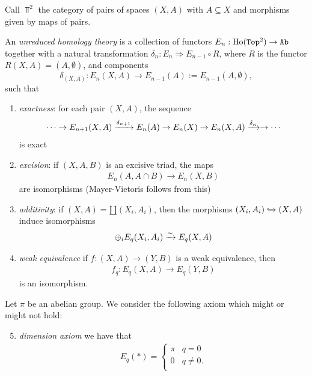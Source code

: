 \documentclass{article}[11pt]
\begin{document}
Call $\Top^2$ the category of pairs of spaces $(X,A)$ with $A\subseteq X$ and morphisms given by maps of pairs.

\begin{definition}\label{defn:unreduced-homology-thy} An \textit{unreduced homology theory} is a collection of functors $E_n : \text{Ho}(\texttt{Top}^2) \to \texttt{Ab}$ together with a natural transformation $\delta_n: E_n \Rightarrow E_{n-1}\circ R$, where $R$ is the functor $R(X,A) = (A,\emptyset)$, and components
\[
	\delta_{(X,A)}: E_n(X,A) \to E_{n-1}(A):=E_{n-1}(A,\emptyset),
\]
such that
\begin{enumerate}
	\item \textit{exactness}: for each pair $(X,A)$, the sequence
	\begin{align*}
		\cdots \to E_{n+1}(X,A) \xrightarrow{\delta_{n+1}} E_n(A) \to E_n(X) \to E_n(X,A) \xrightarrow{\delta_n} \to \cdots
	\end{align*}
	is exact

	\item \textit{excision}: if $(X,A,B)$ is an excisive triad, the maps
	\begin{align*}
		E_n(A, A\cap B) \to E_n(X,B)
	\end{align*}
	are isomorphisms (Mayer-Vietoris follows from this)

	\item \textit{additivity}: if $(X,A) = \amalg (X_i, A_i)$, then the morphisms $(X_i, A_i) \xhookrightarrow{} (X,A)$ induce isomorphisms
	\begin{align*}
		\oplus_i E_q(X_i, A_i) \xrightarrow{\sim} E_q(X,A)
	\end{align*}

	\item \textit{weak equivalence} if $f:(X,A) \to (Y,B)$ is a weak equivalence, then
	\begin{align*}
		f_q : E_q(X,A) \to E_q(Y,B)
	\end{align*}
	is an isomorphism.
\end{enumerate}

Let $\pi$ be an abelian group. We consider the following axiom which might or might not hold:
\begin{enumerate}\setcounter{enumi}{4}
	\item \textit{dimension axiom} we have that
	\begin{align*}
		E_q (\ast) = \begin{cases} \pi & q=0 \\ 0 & q\neq 0. \\ \end{cases}
	\end{align*}
\end{enumerate}
\end{definition}
\end{document}
